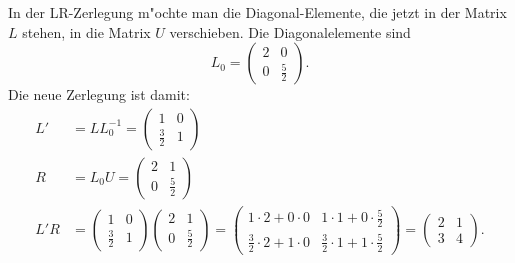 \begin{loesung}
In der LR-Zerlegung m"ochte man die Diagonal-Elemente, die jetzt in
der Matrix $L$ stehen, in die Matrix $U$ verschieben. Die Diagonalelemente
sind
\[
L_0=\begin{pmatrix}2&0\\0&\frac52\end{pmatrix}.
\]
Die neue Zerlegung ist damit:
\begin{align*}
L'&=LL_0^{-1}=
\begin{pmatrix}
1&0\\
\frac32&1
\end{pmatrix}
\\
R&=L_0U=
\begin{pmatrix}
2&1\\
0&\frac52
\end{pmatrix}
\\
L'R&=
\begin{pmatrix}
1&0\\
\frac32&1
\end{pmatrix}
\begin{pmatrix}
2&1\\
0&\frac52
\end{pmatrix}
=\begin{pmatrix}
1\cdot 2+0\cdot 0 & 1 \cdot 1+0\cdot \frac52\\
\frac32\cdot 2+1\cdot 0&\frac32\cdot 1+1\cdot\frac52
\end{pmatrix}
=
\begin{pmatrix}
2&1\\3&4
\end{pmatrix}.
\end{align*}
\end{loesung}


